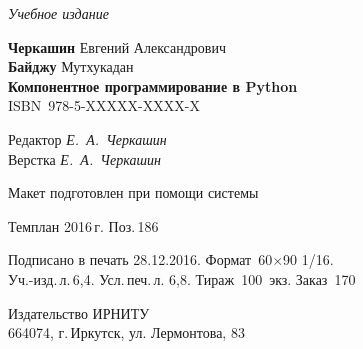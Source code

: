 \documentclass[a4paper,openany,twoside,final]{book}
\providecommand{\DUadmonition}[2][class-arg]{%
  \ifcsname DUadmonition#1\endcsname%
    \csname DUadmonition#1\endcsname{#2}%
  \else
    \begin{center}
      \fbox{\parbox{0.9\textwidth}{#2}}
    \end{center}
  \fi
}
\providecommand*{\DUtitle}[2][class-arg]{%
  \ifcsname DUtitle#1\endcsname%
    \csname DUtitle#1\endcsname{#2}%
  \else
    \smallskip\noindent\textbf{#2}\smallskip%
  \fi
}
\begin{document}





\newpage
\thispagestyle{empty}
\mbox{}

\vfill\vfill\vfill\vfill

\hfill{}{\small\itshape Учебное издание}
\vspace{4ex}
\begin{center}
{\small\textbf{Черкашин} Евгений Александрович\\}
{\small\textbf{Байджу} Мутхукадан\\[1em]}
{\bfseries Компонентное программирование в Python}\\[1em]
ISBN~978-5-XXXXX-XXXX-X
\vfill

\small
Редактор \textit{Е.~А.~Черкашин}\\
Верстка \textit{Е.~А.~Черкашин}

\vfill{}
{\small Макет подготовлен при помощи системы \LaTeXsys\\\mbox{}}
\vfill{}

Темплан 2016\,{}г. Поз.\,{}186

\end{center}
\begin{center}\small
\noindent Подписано в печать 28.12.2016.
Формат~60$\times$90 1/16.\\  %
Уч.-изд.\,{}л.\,{}6,4. Усл.\,{}печ.\,{}л. 6,8. Тираж~100~экз. Заказ~170
\end{center}
\vspace{1           ex}
\begin{center}\small
Издательство ИРНИТУ\\{}
664074, г.\,{}Иркутск, ул. Лермонтова, 83 \label{lastpage}
\end{center}
\end{document}
